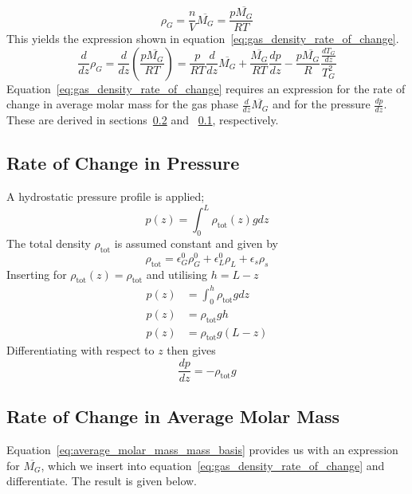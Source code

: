 \documentclass{article}
\begin{document}
\begin{equation}
	\rho_G=\frac{n}{V}\overline{M_G}=\frac{p\overline{M_G}}{RT}
	\label{eq:gas_density_by_ideal_gas_law}
\end{equation}
This yields the expression shown in equation~\ref{eq:gas_density_rate_of_change}.
\begin{equation}
	\frac{d}{dz}\rho_G = \frac{d}{dz}\left( \frac{p\overline{M_G}}{RT}\right) = \frac{p}{RT}\frac{d}{dz} \overline{M_G} + \frac{\overline{M_G} }{RT}\frac{dp}{dz} - \frac{p\overline{M_G}}{R}\frac{\frac{dT_G}{dz}}{T_G^2}
	\label{eq:gas_density_rate_of_change}
\end{equation}
Equation~\ref{eq:gas_density_rate_of_change} requires an expression for the rate of change in average molar mass for the gas phase $\frac{d}{dz}\overline{M_G}$ and for the pressure $\frac{dp}{dz}$. These are derived in sections~\ref{sec:rate_of_change_average_molar_mass} and ~\ref{sec:rate_of_change_pressure}, respectively.

\subsection{Rate of Change in Pressure}
\label{sec:rate_of_change_pressure}
A hydrostatic pressure profile is applied;
\begin{equation}
	p(z) = \int_0^L\rho_{\mathrm{tot}}(z)gdz
\end{equation}
The total density $\rho_{\mathrm{tot}}$ is assumed constant and given by
\begin{equation}
	\rho_{\mathrm{tot}} = \epsilon_G^0\rho_G^0 + \epsilon_L^0\rho_L + \epsilon_s\rho_s
\end{equation}
Inserting for  $\rho_{\mathrm{tot}}(z)=\rho_{\mathrm{tot}}$ and utilising $h = L-z$
\begin{equation}
	\begin{split}
	p(z) &= \int_0^h\rho_{\mathrm{tot}}gdz\\
	p(z) &= \rho_{\mathrm{tot}}gh \\
	p(z) &= \rho_{\mathrm{tot}}g(L-z)
	\end{split}
\end{equation}
Differentiating with respect to $z$ then gives
\begin{equation}
	\frac{dp}{dz} = -\rho_{\mathrm{tot}}g
	\label{eq:rate_of_change_pressure}
\end{equation}

\subsection{Rate of Change in Average Molar Mass}
\label{sec:rate_of_change_average_molar_mass}
Equation~\ref{eq:average_molar_mass_mass_basis} provides us with an expression for $\overline{M_G}$, which we insert into equation~\ref{eq:gas_density_rate_of_change} and differentiate. The result is given below. 
\end{document}
